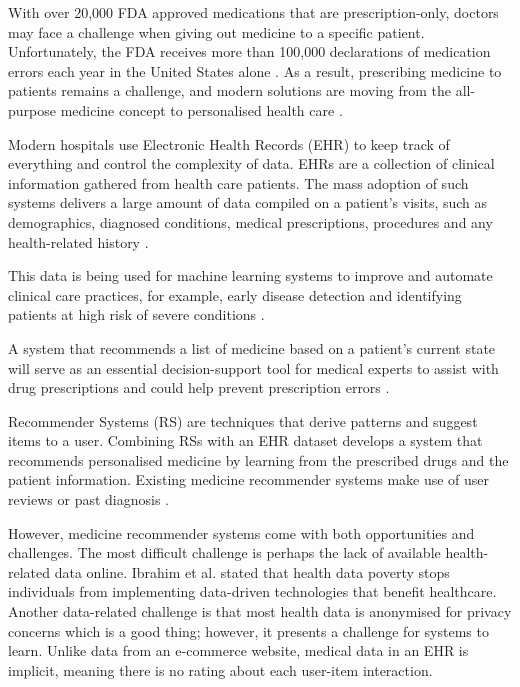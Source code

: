 With over 20,000 FDA approved medications that are prescription-only,
doctors may face a challenge when giving out medicine to a specific
patient. Unfortunately, the FDA receives more than 100,000 declarations
of medication errors each year in the United States alone \cite{FDA2021}.
As a result, prescribing medicine to patients remains a challenge, and
modern solutions are moving from the all-purpose medicine concept to
personalised health care \cite{Bhoi2021}.

Modern hospitals use Electronic Health Records (EHR) to keep track of
everything and control the complexity of data. EHRs are a collection of
clinical information gathered from health care patients. The mass
adoption of such systems delivers a large amount of data compiled on a
patient's visits, such as demographics, diagnosed conditions, medical
prescriptions, procedures and any health-related history \cite{Kim2019}.

This data is being used for machine learning systems to improve and
automate clinical care practices, for example, early disease detection
and identifying patients at high risk of severe conditions
\cite{10.2307/20720782, Juhn2019}.

A system that recommends a list of medicine based on a patient's current
state will serve as an essential decision-support tool for medical
experts to assist with drug prescriptions and could help prevent
prescription errors \cite{Jamshidi2018}. 

Recommender Systems (RS) are techniques that derive patterns and suggest
items to a user. Combining RSs with an EHR dataset develops 
a system that recommends personalised medicine by learning from
the prescribed drugs and the patient information. Existing medicine
recommender systems make use of user reviews or past
diagnosis \cite{Bhoi2021, Rao2020}.

However, medicine recommender systems come with both opportunities and
challenges. The most difficult challenge is perhaps the lack of available
health-related data online. Ibrahim et al. \cite{Ferner2000} stated that
health data poverty stops individuals from implementing data-driven
technologies that benefit healthcare. Another data-related challenge is
that most health data is anonymised for privacy concerns which is a good
thing; however, it presents a challenge for systems to learn. Unlike data
from an e-commerce website, medical data in an EHR is implicit, meaning
there is no rating about each user-item interaction.

